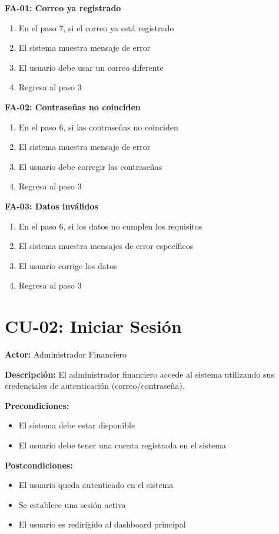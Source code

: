 \textbf{FA-01: Correo ya registrado}
\begin{enumerate}
    \item En el paso 7, si el correo ya está registrado
    \item El sistema muestra mensaje de error
    \item El usuario debe usar un correo diferente
    \item Regresa al paso 3
\end{enumerate}

\textbf{FA-02: Contraseñas no coinciden}
\begin{enumerate}
    \item En el paso 6, si las contraseñas no coinciden
    \item El sistema muestra mensaje de error
    \item El usuario debe corregir las contraseñas
    \item Regresa al paso 3
\end{enumerate}

\textbf{FA-03: Datos inválidos}
\begin{enumerate}
    \item En el paso 6, si los datos no cumplen los requisitos
    \item El sistema muestra mensajes de error específicos
    \item El usuario corrige los datos
    \item Regresa al paso 3
\end{enumerate}

\section{CU-02: Iniciar Sesión}

\noindent\textbf{Actor:} Administrador Financiero

\noindent\textbf{Descripción:} El administrador financiero accede al sistema utilizando sus credenciales de autenticación (correo/contraseña).

\noindent\textbf{Precondiciones:}
\begin{itemize}
    \item El sistema debe estar disponible
    \item El usuario debe tener una cuenta registrada en el sistema
\end{itemize}

\noindent\textbf{Postcondiciones:}
\begin{itemize}
    \item El usuario queda autenticado en el sistema
    \item Se establece una sesión activa
    \item El usuario es redirigido al dashboard principal
\end{itemize}

